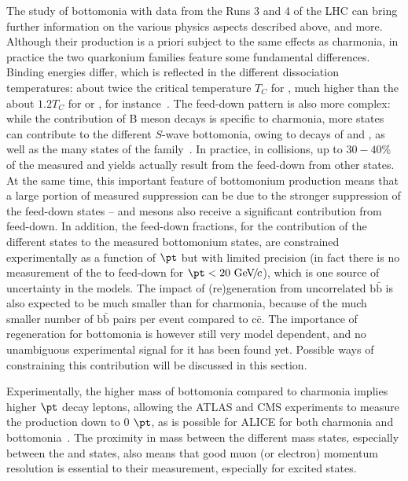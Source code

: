 \documentclass[../report.tex]{subfiles}
\begin{document}
The study of bottomonia with \PbPb data from the Runs 3 and 4 of the LHC can bring further information on the various physics aspects described above, and more.
Although their production is a priori subject to the same effects as charmonia, in practice the two quarkonium families feature some fundamental differences.
Binding energies differ, which is reflected in the different dissociation temperatures: about twice the critical temperature $T_C$ for , much higher than the about
$1.2 T_C$ for \PJgy or , for instance~\cite{Mocsy:2007jz}. The feed-down pattern is also more complex: while the contribution of B meson decays is specific to charmonia, more states can
contribute to the different $S$-wave bottomonia, owing to decays of  and , as well as the many states of the \PGcb family~\cite{Andronic:2015wma}. In practice, in \pp collisions, up to $30-40$\% of the measured 
 and  yields actually result from the feed-down from other states. At the same time, this important feature of bottomonium production means that
a large portion of measured  suppression can be due to the stronger suppression of the feed-down states --  and  mesons also receive a significant contribution from feed-down.
In addition, the feed-down fractions, for the contribution of the 
different states to the measured bottomonium states, are constrained experimentally as a function of $\pt$ but with limited precision (in fact there is no measurement of the  to  feed-down for $\pt<20\UGeVc$), which is one source of uncertainty in the models.
The impact of (re)generation from uncorrelated $\text{b}\bar{\text{b}}$ is also expected to be much smaller than for charmonia, because of the much smaller number of $\text{b}\bar{\text{b}}$
pairs per \PbPb event compared to $\text{c}\bar{\text{c}}$. The importance of regeneration for bottomonia is however still very model dependent, and no unambiguous experimental signal
for it has been found yet. Possible ways of constraining this contribution will be discussed in this section.

Experimentally, the higher mass of bottomonia compared to charmonia implies higher $\pt$ decay leptons, allowing the ATLAS and CMS experiments to measure the production down to 0 $\pt$,
as is possible for ALICE for both charmonia and bottomonia~\cite{Abelev:2014nua,Acharya:2018mni}. The proximity in mass between the different mass states, especially between the  and  states, also 
means that good muon (or electron) momentum resolution is essential to their measurement, especially for excited states. 
\end{document}

